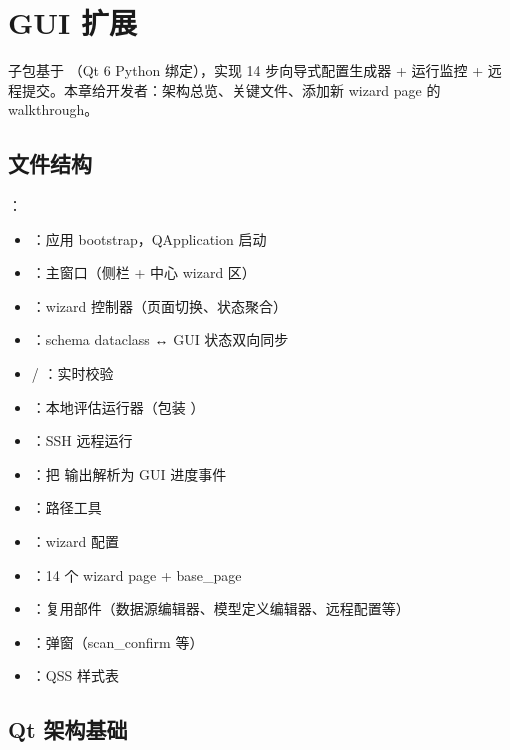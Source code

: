 
\chapter{GUI 扩展}

 子包基于 （Qt 6 Python 绑定），实现 14 步向导式配置生成器 + 运行监控 + 远程提交。本章给开发者：架构总览、关键文件、添加新 wizard page 的 walkthrough。


\section{文件结构}

：

\begin{itemize}
  \item {}：应用 bootstrap，QApplication 启动
  \item {}：主窗口（侧栏 + 中心 wizard 区）
  \item {}：wizard 控制器（页面切换、状态聚合）
  \item {}：schema dataclass ↔ GUI 状态双向同步
  \item {} / ：实时校验
  \item {}：本地评估运行器（包装 ）
  \item {}：SSH 远程运行
  \item {}：把  输出解析为 GUI 进度事件
  \item {}：路径工具
  \item {}：wizard 配置
  \item {}：14 个 wizard page + base\_page
  \item {}：复用部件（数据源编辑器、模型定义编辑器、远程配置等）
  \item {}：弹窗（scan\_confirm 等）
  \item {}：QSS 样式表
\end{itemize}

\section{Qt 架构基础}

